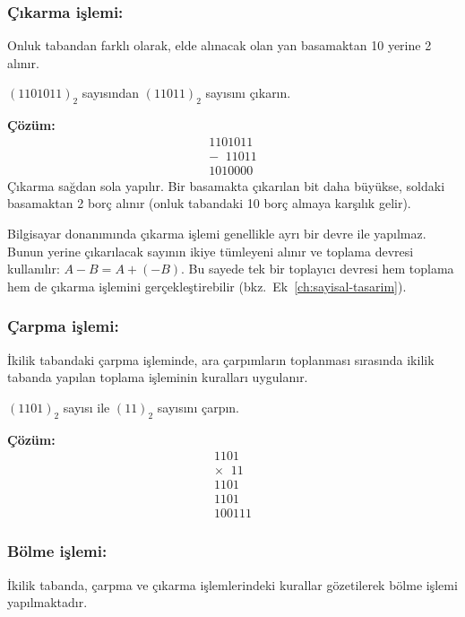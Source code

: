\subsubsection*{Çıkarma işlemi:} Onluk tabandan farklı olarak, elde alınacak olan yan basamaktan 10 yerine 2 alınır.

\begin{ornek}[A.6]
$(1101011)_2$ sayısından $(11011)_2$ sayısını çıkarın.

\textbf{Çözüm:}
\[
\begin{array}{r}
1101011 \\
- \;\; 11011 \\
\hline
1010000
\end{array}
\]
Çıkarma sağdan sola yapılır. Bir basamakta çıkarılan bit daha büyükse, soldaki basamaktan 2 borç alınır (onluk tabandaki 10 borç almaya karşılık gelir).
\end{ornek}

Bilgisayar donanımında çıkarma işlemi genellikle ayrı bir devre ile yapılmaz. Bunun yerine çıkarılacak sayının ikiye tümleyeni alınır ve toplama devresi kullanılır: $A - B = A + (-B)$. Bu sayede tek bir toplayıcı devresi hem toplama hem de çıkarma işlemini gerçekleştirebilir (bkz.\ Ek~\ref{ch:sayisal-tasarim}).

\subsubsection*{Çarpma işlemi:} İkilik tabandaki çarpma işleminde, ara çarpımların toplanması sırasında ikilik tabanda yapılan toplama işleminin kuralları uygulanır.

\begin{ornek}[A.7]
$(1101)_2$ sayısı ile $(11)_2$ sayısını çarpın.

\textbf{Çözüm:}
\[
\begin{array}{r}
1101 \\
\times \;\; 11 \\
\hline
1101 \\
1101\phantom{0} \\
\hline
100111
\end{array}
\]
\end{ornek}

\subsubsection*{Bölme işlemi:} İkilik tabanda, çarpma ve çıkarma işlemlerindeki kurallar gözetilerek bölme işlemi yapılmaktadır.

